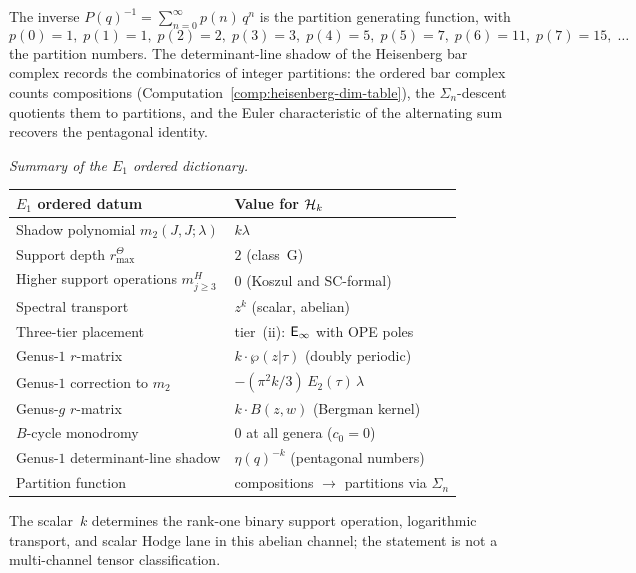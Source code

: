 \begin{computation}
The inverse $P(q)^{-1} = \sum_{n=0}^{\infty} p(n)\, q^n$ is the
partition generating function, with
\[
p(0) = 1,\;
p(1) = 1,\;
p(2) = 2,\;
p(3) = 3,\;
p(4) = 5,\;
p(5) = 7,\;
p(6) = 11,\;
p(7) = 15,\;
\ldots
\]
the partition numbers. The determinant-line shadow of the Heisenberg
bar complex records the combinatorics of integer partitions: the
ordered bar complex counts compositions
(Computation~\ref{comp:heisenberg-dim-table}), the $\Sigma_n$-descent
quotients them to partitions, and the Euler characteristic of the
alternating sum recovers the pentagonal identity.

\smallskip
\noindent
\emph{Summary of the $E_1$ ordered dictionary.}
\begin{center}
\small
\renewcommand{\arraystretch}{1.25}
\begin{tabular}{@{}l@{\;\;}l@{}}
\textbf{$E_1$ ordered datum} & \textbf{Value for $\mathcal{H}_k$} \\
\hline
Shadow polynomial $m_2(J,J;\lambda)$
 & $k\lambda$ \\[2pt]
Support depth $r^\Theta_{\max}$
 & $2$ (class~G) \\[2pt]
Higher support operations $m^H_{j \ge 3}$
 & $0$ (Koszul and SC-formal) \\[2pt]
Spectral transport
 & $z^k$ (scalar, abelian) \\[2pt]
Three-tier placement
 & tier~(ii): $\mathsf{E}_{\infty}$ with OPE poles \\[2pt]
Genus-$1$ $r$-matrix
 & $k\cdot\wp(z|\tau)$ (doubly periodic) \\[2pt]
Genus-$1$ correction to $m_2$
 & $-(\pi^2 k/3)\, E_2(\tau)\, \lambda$ \\[2pt]
Genus-$g$ $r$-matrix
 & $k \cdot B(z,w)$ (Bergman kernel) \\[2pt]
$B$-cycle monodromy
 & $0$ at all genera ($c_0 = 0$) \\[2pt]
Genus-$1$ determinant-line shadow
 & $\eta(q)^{-k}$ (pentagonal numbers) \\[2pt]
Partition function
 & compositions $\to$ partitions via $\Sigma_n$
\end{tabular}
\end{center}
The scalar~$k$ determines the rank-one binary support operation,
logarithmic transport, and scalar Hodge lane in this abelian channel;
the statement is not a multi-channel tensor classification.
\end{computation}

